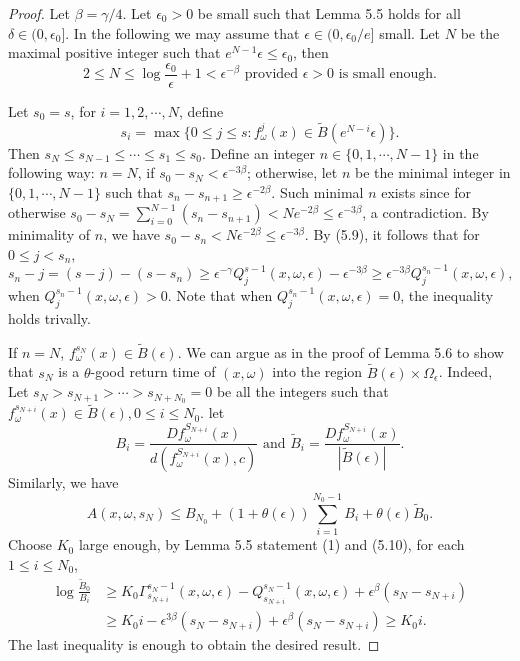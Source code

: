 \documentclass[10pt,a4paper]{amsart}
\begin{document}
\begin{proof}

Let $\beta = \gamma/4$. Let $\epsilon_0 > 0$ be small such that Lemma 5.5 holds for all $\delta \in (0, \epsilon_0]$. In the following we may assume that $\epsilon \in (0, \epsilon_0 /e]$ small. Let $N$ be the maximal positive integer such that $e^{N-1} \epsilon \leq \epsilon_0$, then 
\[
2 \leq N \leq \log \frac{\epsilon_0}{\epsilon} + 1 < \epsilon^{- \beta} \mbox{ provided $\epsilon > 0$  is small enough}.
\]


Let $s_0 = s$, for $i = 1, 2, \cdots, N$, define 
\[
s_i = \max\{0 \leq j \leq s : f_{\omega}^j (x) \in \tilde B(e^{N-i} \epsilon)  \}.
\]
Then $s_N \leq s_{N-1} \leq \cdots \leq s_1 \leq s_0$. Define an integer $n \in \{0, 1, \cdots, N-1\}$ in the following way: $n = N$, if $s_0 - s_N < \epsilon^{-3 \beta}$; otherwise, let $n$ be the minimal integer in $ \{0, 1, \cdots, N-1\}$ such that $s_n - s_{n+1} \geq {\epsilon}^{-2 \beta}$. Such minimal $n$ exists since for otherwise $s_0 - s_N = \sum_{i=0}^{N-1} (s_n - s_{n+1}) < N e^{-2 \beta} \leq {\epsilon}^{-3 \beta}$, a contradiction. By minimality of $n$, we have  $s_0 - s_n < N \epsilon^{-2 \beta} \leq \epsilon^{-3 \beta}$. By (5.9), it follows that for $0 \leq j < s_n$,
\begin{equation}
s_n - j = (s - j) - (s - s_n) \geq \epsilon^{- \gamma} Q_{j}^{s-1} (x, \omega, \epsilon) - \epsilon^{-3 \beta} \geq \epsilon^{- 3\beta} Q_{j}^{s_n-1} (x, \omega, \epsilon),
\end{equation}
when $Q_{j}^{s_n-1} (x, \omega, \epsilon)> 0$. Note that when $Q_{j}^{s_n-1} (x, \omega, \epsilon)= 0$, the inequality holds trivally. 


If $n = N$, $f_{\omega}^{s_N}(x) \in \tilde B(\epsilon) $. We can argue as in the proof of Lemma 5.6 to show that $s_N$ is a $\theta$-good return time of $(x, \omega)$ into the region $\tilde B(\epsilon) \times \Omega_{\epsilon}$. Indeed, Let $s_N > s_{N+1} > \cdots > s_{N+N_0} = 0$ be all the integers such that $f_{\omega}^{s_{N+i}}(x) \in \tilde B(\epsilon), 0 \leq i \leq N_0$. let 
\[
B_i = \frac{Df_{\omega}^{S_{N+i}}(x)}{d(f_{\omega}^{S_{N+i}}(x), c)} \mbox{ and } \tilde B_i = \frac{Df_{\omega}^{S_{N+i}}(x)}{|\tilde B(\epsilon)|}.
\]
Similarly, we have
\[
A(x, \omega, s_N) \leq B_{N_0} + (1+\theta(\epsilon)) \sum_{i = 1}^{N_0 -1} B_i + \theta(\epsilon) \tilde B_0.
\]
Choose $K_0$ large enough, by Lemma 5.5 statement (1) and (5.10), for each $1 \leq i \leq N_0$,
\begin{align*}
\log \frac{\tilde B_0}{B_i}& \geq K_0 \Gamma_{s_{N+i}}^{s_N-1} (x, \omega, \epsilon) - Q_{s_{N+i}}^{s_N-1} (x, \omega, \epsilon) + \epsilon^{\beta}(s_N - s_{N+i})\\
&  \geq K_0 i  - \epsilon^{3 \beta} (s_N - s_{N+i}) + \epsilon^{\beta} (s_N - s_{N+i}) \geq K_0 i.
\end{align*}
The last inequality is enough to obtain the desired result.



\end{proof}
\end{document}
